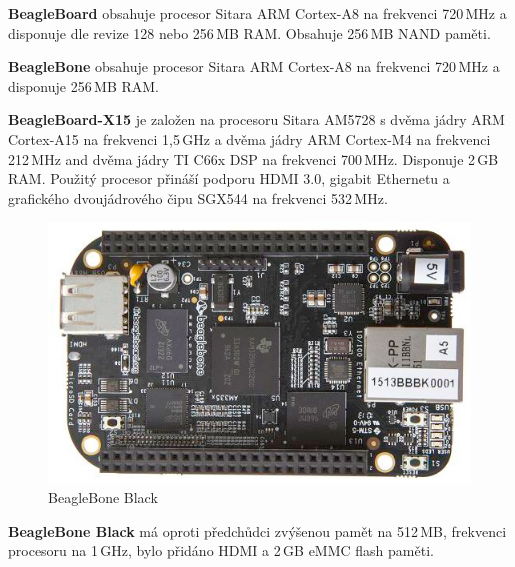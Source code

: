 \textbf{BeagleBoard} obsahuje procesor Sitara ARM Cortex-A8 na frekvenci 720\,MHz a disponuje dle revize 128 nebo 256\,MB RAM. Obsahuje 256\,MB NAND paměti.

\textbf{BeagleBone} obsahuje procesor Sitara ARM Cortex-A8 na frekvenci 720\,MHz a disponuje 256\,MB RAM.

\textbf{BeagleBoard-X15} je založen na procesoru Sitara AM5728 s dvěma jádry ARM Cortex-A15 na frekvenci 1,5\,GHz a dvěma jádry ARM Cortex-M4 na frekvenci 212\,MHz and dvěma jádry TI C66x DSP na frekvenci 700\,MHz. Disponuje 2\,GB RAM. Použitý procesor přináší podporu HDMI 3.0, gigabit Ethernetu a grafického dvoujádrového čipu SGX544 na frekvenci 532\,MHz. 

	\begin{figure}[!ht]
  \begin{center}
    \includegraphics[scale=0.7]{obrazky/embed_beaglebone_black}
  \end{center}
	\vspace{-20pt}
  \caption{BeagleBone Black~\cite{BeagleBone}}
\end{figure}

\textbf{BeagleBone Black} má oproti předchůdci zvýšenou pamět na 512\,MB, frekvenci procesoru na 1\,GHz, bylo přidáno HDMI a 2\,GB eMMC flash paměti.


